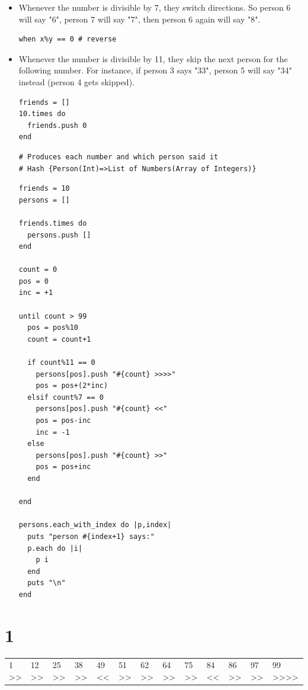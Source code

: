 \documentclass[11pt]{article}
\begin{document}
\begin{itemize}
\item Whenever the number is divisible by 7, they switch directions. So person 6 
will say "6", person 7 will say "7", then person 6 again will say "8".

\begin{verbatim}
when x%y == 0 # reverse
\end{verbatim}

\item Whenever the number is divisible by 11, they skip the next person for the 
following number. For instance, if person 3 says "33", person 5 will say 
"34" instead (person 4 gets skipped).

\begin{verbatim}
friends = []
10.times do 
  friends.push 0
end
\end{verbatim}

\begin{verbatim}
# Produces each number and which person said it
# Hash {Person(Int)=>List of Numbers(Array of Integers)}
\end{verbatim}

\begin{verbatim}
friends = 10
persons = []

friends.times do
  persons.push []
end

count = 0
pos = 0
inc = +1

until count > 99
  pos = pos%10
  count = count+1

  if count%11 == 0
    persons[pos].push "#{count} >>>>"
    pos = pos+(2*inc)
  elsif count%7 == 0
    persons[pos].push "#{count} <<"
    pos = pos-inc
    inc = -1
  else
    persons[pos].push "#{count} >>"
    pos = pos+inc
  end

end

persons.each_with_index do |p,index|
  puts "person #{index+1} says:"
  p.each do |i|
    p i
  end
  puts "\n"
end
\end{verbatim}
\end{itemize}
\section{1}
\label{sec-3}
\begin{center}
\begin{tabular}{lllllllllllll}
1 >> & 12 >> & 25 >> & 38 >> & 49 << & 51 >> & 62 >> & 64 >> & 75 >> & 84 << & 86 >> & 97 >> & 99 >>>>\\
\end{tabular}
\end{center}
\end{document}
